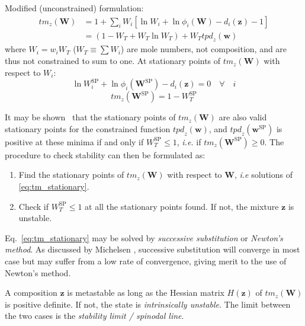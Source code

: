 \documentclass[internal,english]{sintefmemo2012}
\newcommand*{\vektor}[1]{\boldsymbol{#1}}%
\begin{document}
Modified (unconstrained) formulation:
\begin{align}
  \mathit{tm}_z(\vektor{W}) &= 1 + \sum_{i} W_i \left[ \ln W_i + \ln \phi_i(\vektor{W}) - d_i(\vektor{z}) -1\right]
  \nonumber\\
  &= \left( 1 - W_T + W_T \ln W_T \right) + W_T \mathit{tpd}_z(\vektor{w})
  \label{eq:tm}
\end{align}
where $W_i = w_i W_T$ ($W_T \equiv \sum W_i $) are mole numbers, not composition, and are thus not constrained to sum to one.
At stationary points of $\mathit{tm}_z(\vektor{W})$ with respect to $W_i$:
\begin{equation}
  \ln W_i^\text{SP} + \ln \phi_i(\vektor{W}^\text{SP}) - d_i(\vektor{z}) = 0 \quad \forall \quad i
  \label{eq:tm_stationary}
\end{equation}
\begin{equation}
  \mathit{tm}_z(\vektor{W}^\text{SP}) = 1 - W_T^\text{SP} 
  \label{}
\end{equation}

It may be shown~\cite[Ch.~9]{michelsen07} that the stationary points of
$\mathit{tm}_z(\vektor{W})$ are also valid stationary points for the
constrained function $\mathit{tpd}_z(\vektor{w})$, and
$\mathit{tpd}_z(\vektor{w}^\text{SP})$ is positive at these minima if and only
if $W_T^\text{SP} \leq 1$, \textit{i.e.} if
$\mathit{tm}_z(\vektor{W}^\text{SP}) \geq 0$. The procedure to check stability
can then be formulated as:
\begin{framed}
\begin{enumerate}
  \item Find the stationary points of $\mathit{tm}_z(\vektor{W})$ with respect to $\vektor{W}$, \textit{i.e} solutions of \eqref{eq:tm_stationary}.
  \item Check if $W_T^\text{SP} \leq 1$ at all the stationary points found. If not, the mixture $\vektor{z}$ is unstable.
\end{enumerate}
\end{framed}
Eq.~\eqref{eq:tm_stationary} may be solved by \textit{successive substitution}
or \textit{Newton's method}. As discussed by Michelsen \cite{michelsen07},
successive substitution will converge in most case but may suffer from a low
rate of convergence, giving merit to the use of Newton's method. 

A composition $\vektor{z}$ is metastable as long as the Hessian matrix 
$H(\vektor{z})$ 
of $\mathit{tm}_z(\vektor{W})$ is positive definite. 
If not, the state is \textit{intrinsically unstable}. 
The limit between the two cases is the 
\textit{stability limit / spinodal line}.
\end{document}
